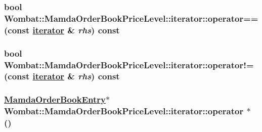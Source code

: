 \hypertarget{classWombat_1_1MamdaOrderBookPriceLevel_1_1iterator_cdc9701f6cebfc4fde6b6459d1248346}{
\subsubsection[operator==]{\setlength{\rightskip}{0pt plus 5cm}bool Wombat::Mamda\-Order\-Book\-Price\-Level::iterator::operator== (const \hyperlink{classWombat_1_1MamdaOrderBookPriceLevel_1_1iterator}{iterator} \& {\em rhs}) const}}
\label{classWombat_1_1MamdaOrderBookPriceLevel_1_1iterator_cdc9701f6cebfc4fde6b6459d1248346}


\hypertarget{classWombat_1_1MamdaOrderBookPriceLevel_1_1iterator_fa1318e5e4c9473701cb88b6f63ff810}{
\subsubsection[operator"!=]{\setlength{\rightskip}{0pt plus 5cm}bool Wombat::Mamda\-Order\-Book\-Price\-Level::iterator::operator!= (const \hyperlink{classWombat_1_1MamdaOrderBookPriceLevel_1_1iterator}{iterator} \& {\em rhs}) const}}
\label{classWombat_1_1MamdaOrderBookPriceLevel_1_1iterator_fa1318e5e4c9473701cb88b6f63ff810}


\hypertarget{classWombat_1_1MamdaOrderBookPriceLevel_1_1iterator_e296e90ab5446a8c567c3d1f87a974bc}{
\subsubsection[operator $\ast$]{\setlength{\rightskip}{0pt plus 5cm}\hyperlink{classWombat_1_1MamdaOrderBookEntry}{Mamda\-Order\-Book\-Entry}$\ast$ Wombat::Mamda\-Order\-Book\-Price\-Level::iterator::operator $\ast$ ()}}
\label{classWombat_1_1MamdaOrderBookPriceLevel_1_1iterator_e296e90ab5446a8c567c3d1f87a974bc}



